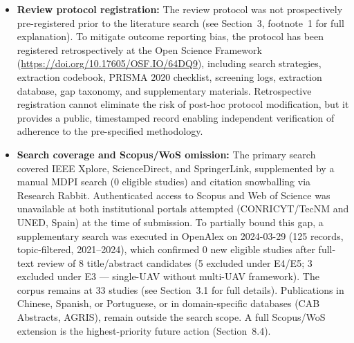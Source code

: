 \documentclass[review,3p,times]{elsarticle}
\begin{document}
\begin{itemize}
{\begin{itemize}
  \item \textbf{Review protocol registration:} The review protocol was not prospectively pre-registered prior to the literature search (see Section~3, footnote~1 for full explanation). To mitigate outcome reporting bias, the protocol has been registered retrospectively at the Open Science Framework (\url{https://doi.org/10.17605/OSF.IO/64DQ9}), including search strategies, extraction codebook, PRISMA 2020 checklist, screening logs, extraction database, gap taxonomy, and supplementary materials. Retrospective registration cannot eliminate the risk of post-hoc protocol modification, but it provides a public, timestamped record enabling independent verification of adherence to the pre-specified methodology.
  \item \textbf{Search coverage and Scopus/WoS omission:} The primary search covered IEEE Xplore, ScienceDirect, and SpringerLink, supplemented by a manual MDPI search (0 eligible studies) and citation snowballing via Research Rabbit. Authenticated access to Scopus and Web of Science was unavailable at both institutional portals attempted (CONRICYT/TecNM and UNED, Spain) at the time of submission. To partially bound this gap, a supplementary search was executed in OpenAlex on 2024-03-29 (125 records, topic-filtered, 2021--2024), which confirmed 0 new eligible studies after full-text review of 8 title/abstract candidates (5 excluded under E4/E5; 3 excluded under E3 — single-UAV without multi-UAV framework). The corpus remains at 33 studies (see Section~3.1 for full details). Publications in Chinese, Spanish, or Portuguese, or in domain-specific databases (CAB Abstracts, AGRIS), remain outside the search scope. A full Scopus/WoS extension is the highest-priority future action (Section~8.4).

\end{itemize}}
\end{itemize}
\end{document}

